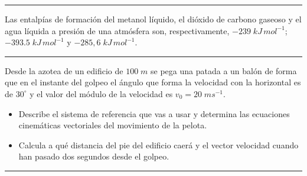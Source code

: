 \documentclass[a4paper,addpoints,12pt]{exam}
\newcommand{\halmos}{\vspace*{-6mm}
	
					\begin{flushright}
						\rule{1mm}{2.5mm} 
					\end{flushright}
					\vspace*{-4mm}
						
					  }
\renewcommand{\qed}{\halmos}
\newcommand\blankpage{%
    \null
    \thispagestyle{empty}%
    \addtocounter{page}{0}%
    \newpage}
\begin{document}
\begin{questions}
  	\qed

\question[2] Las entalpías de formación del metanol líquido, el dióxido de carbono gaseoso y el agua líquida a presión de una atmósfera son, respectivamente, $-239\;kJ\,mol^{-1}$; $-393.5\;kJ\,mol^{-1}$ y $-285,6\;kJ\,mol^{-1}$.
\vspace{1ex}
	
\qed

\question[2] Desde la azotea de un edificio de $100\;m$ se pega una patada a un balón de forma que en el instante del golpeo el ángulo que forma la velocidad con la horizontal es de $30^\circ$ y el valor del módulo de la velocidad es $v_0=20\;ms^{-1}$.
	\begin{itemize}
		\item[a)] Describe el sistema de referencia que vas a usar y determina las ecuaciones cinemáticas vectoriales del movimiento de la pelota.
		\item[b)] Calcula a qué distancia del pie del edificio caerá y el vector velocidad cuando han pasado dos segundos desde el golpeo.
	\end{itemize}
	\qed

\end{questions}	
\end{document}

